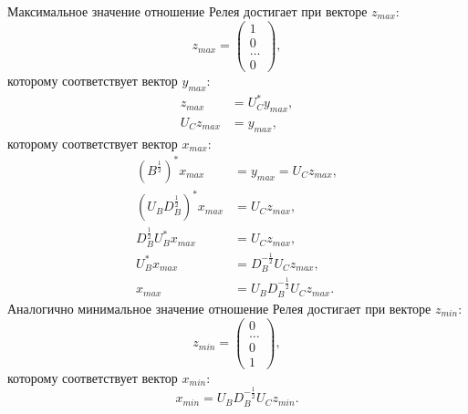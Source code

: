 Максимальное значение отношение Релея достигает при векторе $z_{max}$:
\[
    z_{max}
    = \begin{pmatrix}
          1     \\
          0     \\
          \dots \\
          0
    \end{pmatrix} ,
\]
которому соответствует вектор $y_{max}$:
\begin{align*}
    z_{max} & = U_C^* y_{max} , \\
    U_C z_{max} & = y_{max} ,
\end{align*}
которому соответствует вектор $x_{max}$:
\begin{align*}
    \left ( B^\frac{1}{2} \right )^* x_{max} & = y_{max} = U_C z_{max} , \\
    \left ( U_B D_B^\frac{1}{2} \right )^* x_{max} & = U_C z_{max} , \\
    D_B^\frac{1}{2} U_B^* x_{max} & = U_C z_{max} , \\
    U_B^* x_{max} & = D_B^{-\frac{1}{2}} U_C z_{max} , \\
    x_{max} & = U_B D_B^{-\frac{1}{2}} U_C z_{max} .
\end{align*}
Аналогично минимальное значение отношение Релея достигает при векторе $z_{min}$:
\[
    z_{min}
    = \begin{pmatrix}
          0     \\
          \dots \\
          0     \\
          1
    \end{pmatrix} ,
\]
которому соответствует вектор $x_{min}$:
\[
    x_{min} = U_B D_B^{-\frac{1}{2}} U_C z_{min} .
\]
